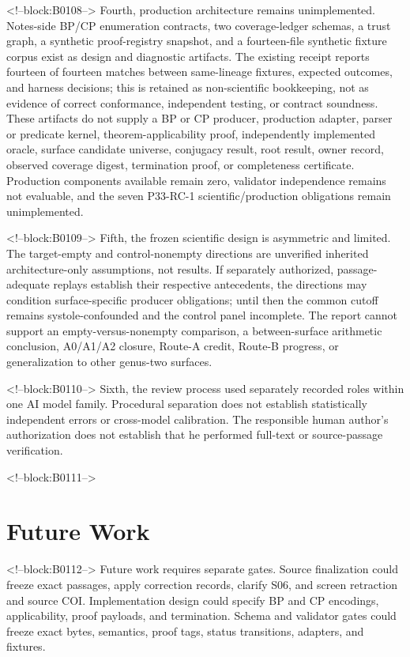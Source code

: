 \documentclass[11pt,a4paper]{article}
\begin{document}
<!--block:B0108-->
Fourth, production architecture remains unimplemented. Notes-side BP/CP enumeration contracts, two coverage-ledger schemas, a trust graph, a synthetic proof-registry snapshot, and a fourteen-file synthetic fixture corpus exist as design and diagnostic artifacts. The existing receipt reports fourteen of fourteen matches between same-lineage fixtures, expected outcomes, and harness decisions; this is retained as non-scientific bookkeeping, not as evidence of correct conformance, independent testing, or contract soundness. These artifacts do not supply a BP or CP producer, production adapter, parser or predicate kernel, theorem-applicability proof, independently implemented oracle, surface candidate universe, conjugacy result, root result, owner record, observed coverage digest, termination proof, or completeness certificate. Production components available remain zero, validator independence remains not evaluable, and the seven P33-RC-1 scientific/production obligations remain unimplemented.

<!--block:B0109-->
Fifth, the frozen scientific design is asymmetric and limited. The target-empty and control-nonempty directions are unverified inherited architecture-only assumptions, not results. If separately authorized, passage-adequate replays establish their respective antecedents, the directions may condition surface-specific producer obligations; until then the common cutoff remains systole-confounded and the control panel incomplete. The report cannot support an empty-versus-nonempty comparison, a between-surface arithmetic conclusion, A0/A1/A2 closure, Route-A credit, Route-B progress, or generalization to other genus-two surfaces.

<!--block:B0110-->
Sixth, the review process used separately recorded roles within one AI model family. Procedural separation does not establish statistically independent errors or cross-model calibration. The responsible human author's authorization does not establish that he performed full-text or source-passage verification.

<!--block:B0111-->
\hypertarget{future-work}{%
\section{Future Work}\label{future-work}}

<!--block:B0112-->
Future work requires separate gates. Source finalization could freeze exact passages, apply correction records, clarify S06, and screen retraction and source COI. Implementation design could specify BP and CP encodings, applicability, proof payloads, and termination. Schema and validator gates could freeze exact bytes, semantics, proof tags, status transitions, adapters, and fixtures.
\end{document}
